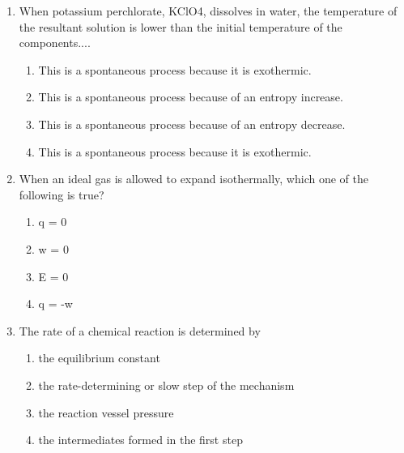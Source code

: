 \documentclass[12pt]{article}
\begin{document}
\begin{enumerate}[label=\arabic*.]
\begin{enumerate}[label=(\alph*)]
    \item Al(NO3)3(s) $\rightarrow$ Al3+(aq) + 3NO3-(aq)
    \item 2Ag+(aq) + Ti(s) $\rightarrow$ 2Ag(s) + Ti2+(aq)
\end{enumerate}
\item When potassium perchlorate, KClO4, dissolves in water, the temperature of the resultant solution is lower than the initial temperature of the components....
\begin{enumerate}[label=(\alph*)]
    \item This is a spontaneous process because it is exothermic.
    \item This is a spontaneous process because of an entropy increase.
    \item This is a spontaneous process because of an entropy decrease.
    \item This is a spontaneous process because it is exothermic.
\end{enumerate}
\item When an ideal gas is allowed to expand isothermally, which one of the following is true?
\begin{enumerate}[label=(\alph*)]
    \item q = 0
    \item w = 0
    \item E = 0
    \item q = -w
\end{enumerate}
\item The rate of a chemical reaction is determined by
\begin{enumerate}[label=(\alph*)]
    \item the equilibrium constant
    \item the rate-determining or slow step of the mechanism
    \item the reaction vessel pressure
    \item the intermediates formed in the first step
\end{enumerate}
\end{enumerate}
\end{document}
